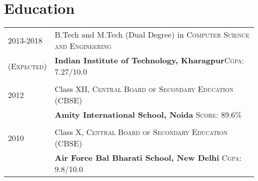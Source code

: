 \documentclass[a4paper,10pt]{extarticle} %
\begin{document}



\section{Education}

\begin{tabular}{R{3.0cm}|p{15.0cm}}	
2013-2018 & B.Tech and M.Tech (Dual Degree) in \textsc{Computer Science and Engineering}\\
\textsc{(Expected)}&\textbf{Indian Institute of Technology, Kharagpur}\hfill\textsc{Cgpa}: 7.27/10.0\\
&\\


2012& Class XII, \textsc{}\textsc{Central Board of Secondary Education (CBSE)} \\
&\normalsize\textbf{Amity International School, Noida} \hfill\textsc{Score}: 89.6\%\\
&\\


2010 & Class X, \textsc{}\textsc{Central Board of Secondary Education (CBSE)} \\
&\normalsize\textbf{Air Force Bal Bharati School, New Delhi} \hfill\textsc{Cgpa}: 9.8/10.0\\

\end{tabular}

\end{document}
